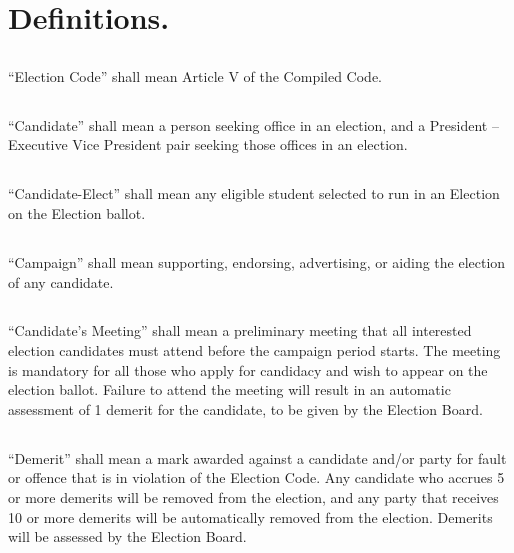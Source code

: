 \article{}

\section{Definitions.}

\subsection{}
``Election Code'' shall mean Article V of the Compiled Code.

\subsection{}
``Candidate'' shall mean a person seeking office in an election, and a President – Executive Vice President pair seeking those offices in an election.

\subsection{}
``Candidate-Elect'' shall mean any eligible student selected to run in an Election on the Election ballot.

\subsection{}
``Campaign'' shall mean supporting, endorsing, advertising, or aiding the election of any candidate.

\subsection{}
``Candidate's Meeting'' shall mean a preliminary meeting that all interested election candidates must attend before the campaign period starts. The meeting is mandatory for all those who apply for candidacy and wish to appear on the election ballot. Failure to attend the meeting will result in an automatic assessment of 1 demerit for the candidate, to be given by the Election Board.

\subsection{}
``Demerit'' shall mean a mark awarded against a candidate and/or party for fault or offence that is in violation of the Election Code. Any candidate who accrues 5 or more demerits will be removed from the election, and any party that receives 10 or more demerits will be automatically removed from the election. Demerits will be assessed by the Election Board.


